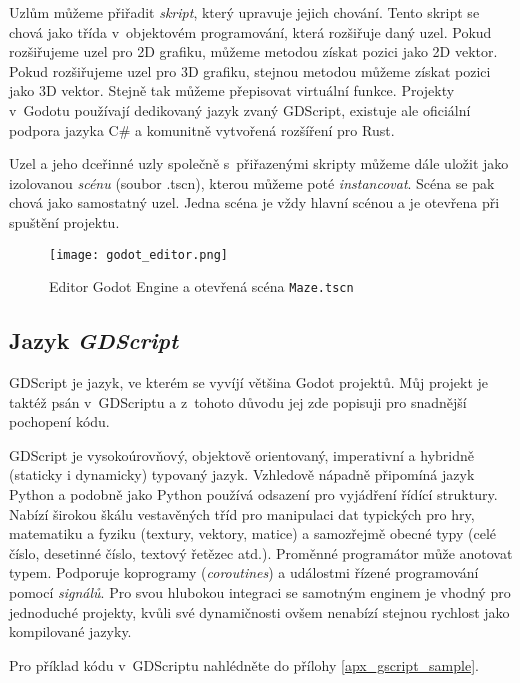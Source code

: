 Uzlům můžeme přiřadit \textit{skript}, který upravuje jejich chování. Tento skript se chová jako třída v~objektovém programování, která rozšiřuje daný uzel. Pokud rozšiřujeme uzel pro 2D grafiku, můžeme metodou získat pozici jako 2D vektor. Pokud rozšiřujeme uzel pro 3D grafiku, stejnou metodou můžeme získat pozici jako 3D vektor. Stejně tak můžeme přepisovat virtuální funkce. Projekty v~Godotu používají dedikovaný jazyk zvaný GDScript, existuje ale oficiální podpora jazyka C\# a komunitně vytvořená rozšíření pro Rust.

Uzel a jeho dceřinné uzly společně s~přiřazenými skripty můžeme dále uložit jako izolovanou \textit{scénu} (soubor .tscn), kterou můžeme poté \textit{instancovat}. Scéna se pak chová jako samostatný uzel. Jedna scéna je vždy hlavní scénou a je otevřena při spuštění projektu.

\begin{figure}[H]
  \centering
  \texttt{[image: godot\_editor.png]}
  \caption{Editor Godot Engine a otevřená scéna \texttt{Maze.tscn}}
  \label{godot_editor_maze_tscn}
\end{figure}

\subsection{Jazyk \textit{GDScript}}

GDScript je jazyk, ve kterém se vyvíjí většina Godot projektů. Můj projekt je taktéž psán v~GDScriptu a z~tohoto důvodu jej zde popisuji pro snadnější pochopení kódu.

GDScript je vysokoúrovňový, objektově orientovaný, imperativní a hybridně (staticky i dynamicky) typovaný jazyk. Vzhledově nápadně připomíná jazyk Python a podobně jako Python používá odsazení pro vyjádření řídící struktury. Nabízí širokou škálu vestavěných tříd pro manipulaci dat typických pro hry, matematiku a fyziku (textury, vektory, matice) a samozřejmě obecné typy (celé číslo, desetinné číslo, textový řetězec atd.). Proměnné programátor může anotovat typem. Podporuje koprogramy (\textit{coroutines}) a událostmi řízené programování pomocí \textit{signálů}. Pro svou hlubokou integraci se samotným enginem je vhodný pro jednoduché projekty, kvůli své dynamičnosti ovšem nenabízí stejnou rychlost jako kompilované jazyky. \cite{gdscript_reference}

Pro příklad kódu v~GDScriptu nahlédněte do přílohy \ref{apx_gscript_sample}.
